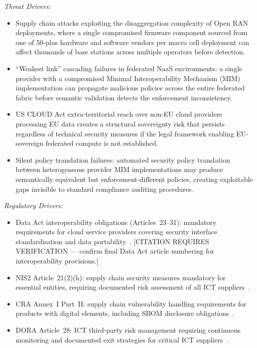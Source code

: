 \begin{enumerate}
\textit{Threat Drivers:}
\begin{itemize}
  \item Supply chain attacks exploiting the disaggregation complexity of Open RAN
        deployments, where a single compromised firmware component sourced from one
        of 50-plus hardware and software vendors per macro cell deployment can affect
        thousands of base stations across multiple operators before detection.
  \item ``Weakest link'' cascading failures in federated NaaS environments: a
        single provider with a compromised Minimal Interoperability Mechanism (MIM)
        implementation can propagate malicious policies across the entire federated
        fabric before semantic validation detects the enforcement inconsistency.
  \item US CLOUD Act extra-territorial reach over non-EU cloud providers processing
        EU data creates a structural sovereignty risk that persists regardless of
        technical security measures if the legal framework enabling EU-sovereign
        federated compute is not established.
  \item Silent policy translation failures: automated security policy translation
        between heterogeneous provider MIM implementations may produce semantically
        equivalent but enforcement-different policies, creating exploitable gaps
        invisible to standard compliance auditing procedures.
\end{itemize}

\textit{Regulatory Drivers:}
\begin{itemize}
  \item Data Act interoperability obligations (Articles~23--31): mandatory
        requirements for cloud service providers covering security interface
        standardisation and data portability~\cite{nis2}.
        [CITATION REQUIRES VERIFICATION --- confirm final Data Act article numbering
        for interoperability provisions.]
  \item NIS2 Article~21(2)(h): supply chain security measures mandatory for essential
        entities, requiring documented risk assessment of all ICT suppliers~\cite{nis2}.
  \item CRA Annex~I Part~II: supply chain vulnerability handling requirements for
        products with digital elements, including SBOM disclosure
        obligations~\cite{cra}.
  \item DORA Article~28: ICT third-party risk management requiring continuous
        monitoring and documented exit strategies for critical ICT
        suppliers~\cite{dora}.
\end{itemize}


\end{enumerate}
